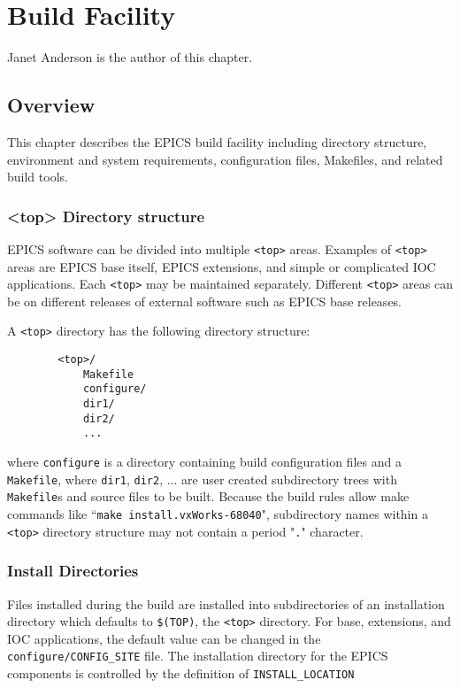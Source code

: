 \chapter{Build Facility}

Janet Anderson is the author of this chapter.

\section{Overview}

This chapter describes the EPICS build facility including directory structure, environment and system requirements, 
configuration files, Makefiles, and related build tools. 

\subsection{\textless{}top\textgreater{} Directory structure}

EPICS software can be divided into multiple \verb|<top>| areas. Examples of \verb|<top>| areas are EPICS base itself, EPICS 
extensions, and simple or complicated IOC applications. Each \verb|<top>| may be maintained separately. Different \verb|<top>| areas 
can be on different releases of external software such as EPICS base releases.

A \verb|<top>| directory has the following directory structure:

\begin{verbatim}
        <top>/
            Makefile
            configure/
            dir1/
            dir2/
            ...
\end{verbatim}

where \verb|configure| is a directory containing build configuration files and a \verb|Makefile|, where \verb|dir1|, \verb|dir2|, ... are user created 
subdirectory trees with \verb|Makefile|s and source files to be built. Because the build rules allow make commands like
``\verb|make install.vxWorks-68040|", subdirectory names within a \verb|<top>| directory structure may not contain a period "\verb|.|" character.

\subsection{Install Directories}

Files installed during the build are installed into subdirectories of an installation directory which defaults to \verb|$(TOP)|, the 
\verb|<top>| directory. For base, extensions, and IOC applications,  the default value can be changed in the \\
\verb|configure/CONFIG_SITE|
file. The installation directory for the EPICS components is controlled by the definition of \verb|INSTALL_LOCATION|

